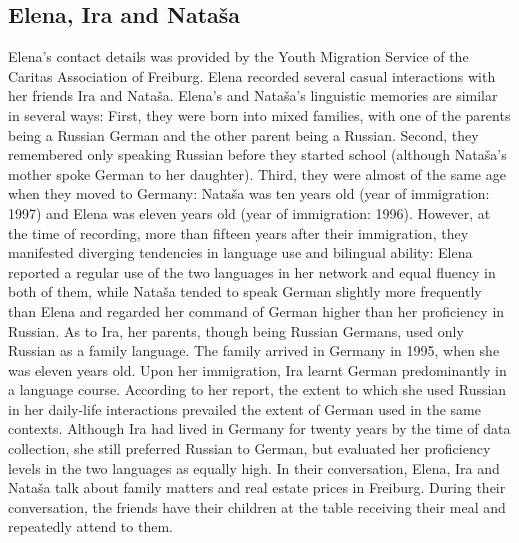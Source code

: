 \subsection{Elena, Ira and Nataša}
Elena's contact details was provided by the Youth Migration Service of the Caritas Association of Freiburg. Elena recorded several casual interactions with her friends Ira and Nataša. Elena's and Nataša's linguistic memories are similar in several ways: First, they were born into mixed families, with one of the parents being a Russian German and the other parent being a Russian. Second, they remembered only speaking Russian before they started school (although Nataša's mother spoke German to her daughter). Third, they were almost of the same age when they moved to Germany: Nataša was ten years old (year of immigration: 1997) and Elena was eleven years old (year of immigration: 1996). However, at the time of recording, more than fifteen years after their immigration, they manifested diverging tendencies in language use and bilingual ability: Elena reported a regular use of the two languages in her network and equal fluency in both of them, while Nataša tended to speak German slightly more frequently than Elena and regarded her command of German higher than her proficiency in Russian. As to Ira, her parents, though being Russian Germans, used only Russian as a family language. The family arrived in Germany in 1995, when she was eleven years old. Upon her immigration, Ira learnt German predominantly in a language course. According to her report, the extent to which she used Russian in her daily-life interactions prevailed the extent of German used in the same contexts. Although Ira had lived in Germany for twenty years  by the time of data collection, she still preferred Russian to German, but evaluated her proficiency levels in the two languages as equally high. In their conversation, Elena, Ira and Nataša talk about family matters and real estate prices in Freiburg. During their conversation, the friends have their children at the table receiving their meal and repeatedly attend to them.

